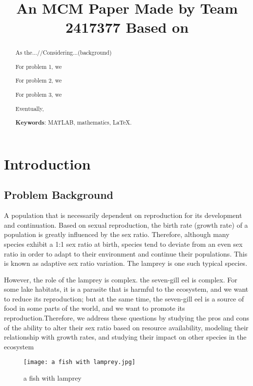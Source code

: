 \documentclass[12pt]{article}  %
\title{An MCM Paper Made by Team 2417377 Based on}  %
\begin{document}
\begin{abstract}
    As the...//Considering...(background)

    For problem 1, we

    For problem 2, we 

    For problem 3, we
    
    Eventually,  

    \vspace{5pt}
    \textbf{Keywords}: MATLAB, mathematics, \LaTeX.

\end{abstract}

\maketitle  %
\tableofcontents  %


\section{Introduction}
\subsection{Problem Background}
A population that is necessarily dependent on reproduction for its development and continuation. Based on sexual reproduction, the birth rate (growth rate) of a population is greatly influenced by the sex ratio. Therefore, although many species exhibit a 1:1 sex ratio at birth, species tend to deviate from an even sex ratio in order to adapt to their environment and continue their populations. This is known as adaptive sex ratio variation\cite{1}. The lamprey is one such typical species.

However, the role of the lamprey is complex. the seven-gill eel is complex. For some lake habitats, it is a parasite that is harmful to the ecosystem, and we want to reduce its reproduction; but at the same time, the seven-gill eel is a source of food in some parts of the world, and we want to promote its reproduction.Therefore, we address these questions by studying the pros and cons of the ability to alter their sex ratio based on resource availability, modeling their relationship with growth rates, and studying their impact on other species in the ecosystem

\begin{figure}[htbp]
	\centering
	\texttt{[image: a fish with lamprey.jpg]}
	\caption{a fish with lamprey}\label{fig:001}
\end{figure}
\end{document}
